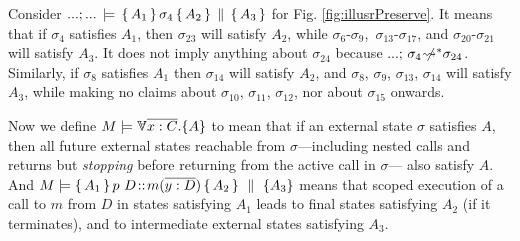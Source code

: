 {\begin{example}
Consider ${...; ...\, \models \, \{\, A_1\,\}\, \sigma_{4} \, \{\, A_2\,\} \,\parallel\, \{\, A_3\,\}  }$   
for Fig. \ref{fig:illusrPreserve}.
It  means  that  if  $\sigma_4$ satisfies $A_1$, 
then $\sigma_{23}$ will satisfy $A_2$, while $\sigma_6$-$\sigma_9$,\ $\sigma_{13}$-$\sigma_{17}$, and $\sigma_{20}$-$\sigma_{21}$ will satisfy $A_3$.
It does not imply anything about $\sigma_{24}$ because $...;\, {\sigma_4} \not\!\!\!{\rightsquigarrow^*} \sigma_{24}$.
Similarly, if $\sigma_8$ satisfies $A_1$ 
then $\sigma_{14}$ will satisfy $A_2$, and  $\sigma_{8}$, $\sigma_{9}$, $\sigma_{13}$, $\sigma_{14}$  will satisfy $A_3$, while making no claims about  $\sigma_{10}$, $\sigma_{11}$, $\sigma_{12}$, nor  about $\sigma_{15}$ onwards.
 \end{example}}

{Now  we} %
 define    $\satisfies{M}{\TwoStatesN {\overline {x:C}} {A}}$ 
to mean that  if an external state $\sigma$ satisfies $A$, then all future external states reachable from $\sigma$—including nested  
 calls and returns but  {\emph{stopping} before}   returning from the active call in $\sigma$— also satisfy $A$. 
 And  $\satisfies{M} { \mprepostN {A_1}{p\ D}{m}{y}{D}{A_2} {A_3} }$ means that scoped execution of a call to $m$ from $D$   in  states satisfying $A_1$ leads to final states satisfying $A_2$ (if it terminates),
 and to intermediate external states satisfying $A_3$.

